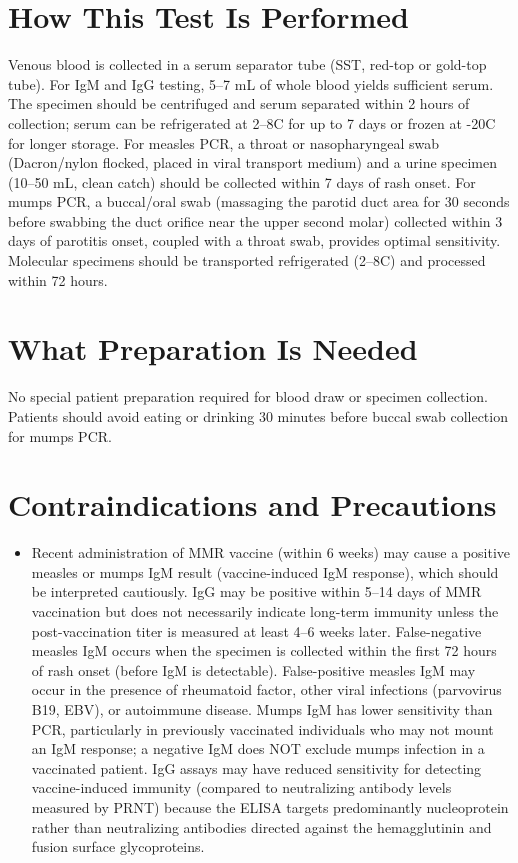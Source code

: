 \section*{How This Test Is Performed}
Venous blood is collected in a serum separator tube (SST, red-top or gold-top tube). For IgM and IgG testing, 5--7 mL of whole blood yields sufficient serum. The specimen should be centrifuged and serum separated within 2 hours of collection; serum can be refrigerated at 2--8\textdegree{}C for up to 7 days or frozen at -20\textdegree{}C for longer storage. For measles PCR, a throat or nasopharyngeal swab (Dacron/nylon flocked, placed in viral transport medium) and a urine specimen (10--50 mL, clean catch) should be collected within 7 days of rash onset. For mumps PCR, a buccal/oral swab (massaging the parotid duct area for 30 seconds before swabbing the duct orifice near the upper second molar) collected within 3 days of parotitis onset, coupled with a throat swab, provides optimal sensitivity. Molecular specimens should be transported refrigerated (2--8\textdegree{}C) and processed within 72 hours.

\section*{What Preparation Is Needed}
No special patient preparation required for blood draw or specimen collection. Patients should avoid eating or drinking 30 minutes before buccal swab collection for mumps PCR.

\section*{Contraindications and Precautions}
\begin{itemize}
  \item Recent administration of MMR vaccine (within 6 weeks) may cause a positive measles or mumps IgM result (vaccine-induced IgM response), which should be interpreted cautiously. IgG may be positive within 5--14 days of MMR vaccination but does not necessarily indicate long-term immunity unless the post-vaccination titer is measured at least 4--6 weeks later. False-negative measles IgM occurs when the specimen is collected within the first 72 hours of rash onset (before IgM is detectable). False-positive measles IgM may occur in the presence of rheumatoid factor, other viral infections (parvovirus B19, EBV), or autoimmune disease. Mumps IgM has lower sensitivity than PCR, particularly in previously vaccinated individuals who may not mount an IgM response; a negative IgM does NOT exclude mumps infection in a vaccinated patient. IgG assays may have reduced sensitivity for detecting vaccine-induced immunity (compared to neutralizing antibody levels measured by PRNT) because the ELISA targets predominantly nucleoprotein rather than neutralizing antibodies directed against the hemagglutinin and fusion surface glycoproteins.
\end{itemize}
